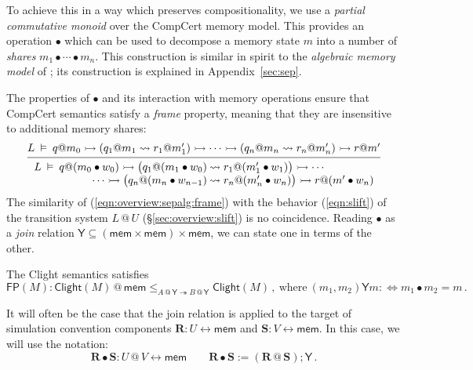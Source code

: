 \documentclass[acmsmall,screen,review,anonymous]{acmart}
\newcommand{\kw}[1]{\ensuremath{ \mathsf{#1} }}
\newcommand{\jr}{\mathsf{Y}}
\begin{document}
To achieve this in a way which preserves compositionality,
we use a \emph{partial commutative monoid}
over the CompCert memory model.
This provides an operation $\bullet$
which can be used to decompose a memory state $m$ into
a number of \emph{shares}
$
  m_1 \bullet \cdots \bullet m_n
$.
This construction
is similar in spirit to the \emph{algebraic memory model}
of \citet{ccal};
its construction is explained in Appendix~\ref{sec:sep}.

The properties of $\bullet$
and its interaction with memory operations
ensure that CompCert semantics satisfy
a \emph{frame} property,
meaning that they are insensitive to
additional memory shares:
\begin{equation} \label{eqn:overview:sepalg:frame}
  \begin{prooftree}
  \hypo{
  L \:\vDash\: q@m_0 \rightarrowtail
    (q_1@m_1 \leadsto r_1@m_1') \rightarrowtail
    \cdots \rightarrowtail
    (q_n@m_n \leadsto r_n@m_n') \rightarrowtail
    r@m'}
  \infer1{
   {\begin{array}{r@{\:}l}
    L \:\vDash\: q@(m_0 \bullet w_0) \rightarrowtail
      \big( q_1@(m_1 \bullet w_0) &\leadsto r_1@(m_1' \bullet w_1) \big) \rightarrowtail
      \cdots \\ \cdots \rightarrowtail
      \big( q_n@(m_n \bullet w_{n-1}) &\leadsto r_n@(m_n' \bullet w_n) \big) \rightarrowtail
      r@(m' \bullet w_n)
   \end{array}} }
  \end{prooftree}
\end{equation}
The similarity of (\ref{eqn:overview:sepalg:frame})
with the behavior (\ref{eqn:slift})
of the transition system $L \mathbin@ U$ (\S\ref{sec:overview:slift})
is no coincidence.
Reading $\bullet$ as a \emph{join} relation
$\jr \subseteq (\kw{mem} \times \kw{mem}) \times \kw{mem}$,
we can state one in terms of the other.

\begin{theorem} \label{thm:clightframe}
The Clight semantics satisfies
\[
  \kw{FP}(M) :
  \kw{Clight}(M) \mathbin@ \kw{mem}
  \le_{A \mathbin@ \jr \twoheadrightarrow B \mathbin@ \jr}
  \kw{Clight}(M)
  \,,
  \: \text{where} \:
  (m_1, m_2) \mathrel{\jr} m  :\Leftrightarrow
  m_1 \bullet m_2 = m
  \,.
\]
\end{theorem}

It will often be the case that the join relation
is applied to the target of
simulation convention components
$\mathbf{R} : U \leftrightarrow \kw{mem}$ and
$\mathbf{S} : V \leftrightarrow \kw{mem}$.
In this case,
we will use the notation:
\[
  \mathbf{R} \bullet \mathbf{S} : U \mathbin@ V \leftrightarrow \kw{mem}
  \qquad
  \mathbf{R} \bullet \mathbf{S} :=
  (\mathbf{R} \mathbin@ \mathbf{S}) \mathbin; \jr
  \,.
\]
\end{document}
